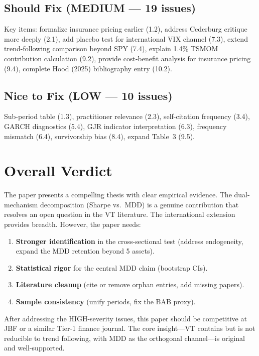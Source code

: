 \documentclass[12pt,a4paper]{article}
\begin{document}
\subsection*{Should Fix (MEDIUM --- 19 issues)}
Key items: formalize insurance pricing earlier (1.2), address Cederburg critique more deeply (2.1), add placebo test for international VIX channel (7.3), extend trend-following comparison beyond SPY (7.4), explain 1.4\% TSMOM contribution calculation (9.2), provide cost-benefit analysis for insurance pricing (9.4), complete Hood (2025) bibliography entry (10.2).

\subsection*{Nice to Fix (LOW --- 10 issues)}
Sub-period table (1.3), practitioner relevance (2.3), self-citation frequency (3.4), GARCH diagnostics (5.4), GJR indicator interpretation (6.3), frequency mismatch (6.4), survivorship bias (8.4), expand Table~3 (9.5).


\section{Overall Verdict}

The paper presents a compelling thesis with clear empirical evidence. The dual-mechanism decomposition (Sharpe vs.\ MDD) is a genuine contribution that resolves an open question in the VT literature. The international extension provides breadth. However, the paper needs:

\begin{enumerate}
\item \textbf{Stronger identification} in the cross-sectional test (address endogeneity, expand the MDD retention beyond 5 assets).
\item \textbf{Statistical rigor} for the central MDD claim (bootstrap CIs).
\item \textbf{Literature cleanup} (cite or remove orphan entries, add missing papers).
\item \textbf{Sample consistency} (unify periods, fix the BAB proxy).
\end{enumerate}

After addressing the HIGH-severity issues, this paper should be competitive at JBF or a similar Tier-1 finance journal. The core insight---VT contains but is not reducible to trend following, with MDD as the orthogonal channel---is original and well-supported.
\end{document}
